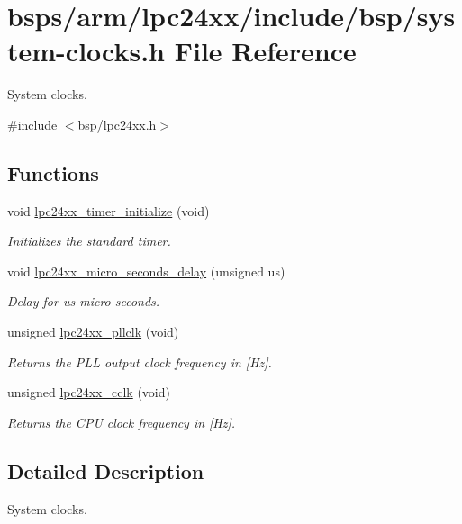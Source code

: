 \hypertarget{lpc24xx_2include_2bsp_2system-clocks_8h}{}\section{bsps/arm/lpc24xx/include/bsp/system-\/clocks.h File Reference}
\label{lpc24xx_2include_2bsp_2system-clocks_8h}


System clocks.  


{\ttfamily \#include $<$bsp/lpc24xx.\+h$>$}\newline
\subsection*{Functions}
\begin{DoxyCompactItemize}
\item 
void \mbox{\hyperlink{group__lpc24xx__clock_gab3adf1ba12bf721c8229c9f473099d87}{lpc24xx\+\_\+timer\+\_\+initialize}} (void)
\begin{DoxyCompactList}\small\item\em Initializes the standard timer. \end{DoxyCompactList}\item 
void \mbox{\hyperlink{group__lpc24xx__clock_gac1fffb9076567b431b33ef1028873a78}{lpc24xx\+\_\+micro\+\_\+seconds\+\_\+delay}} (unsigned us)
\begin{DoxyCompactList}\small\item\em Delay for {\itshape us} micro seconds. \end{DoxyCompactList}\item 
unsigned \mbox{\hyperlink{group__lpc24xx__clock_ga985f11224a9ca5c881d6a7da40eb1b97}{lpc24xx\+\_\+pllclk}} (void)
\begin{DoxyCompactList}\small\item\em Returns the P\+LL output clock frequency in \mbox{[}Hz\mbox{]}. \end{DoxyCompactList}\item 
unsigned \mbox{\hyperlink{group__lpc24xx__clock_ga1f89dbcdb26c1d4fe517abf6691f3a91}{lpc24xx\+\_\+cclk}} (void)
\begin{DoxyCompactList}\small\item\em Returns the C\+PU clock frequency in \mbox{[}Hz\mbox{]}. \end{DoxyCompactList}\end{DoxyCompactItemize}


\subsection{Detailed Description}
System clocks. 

